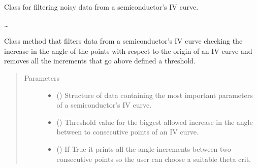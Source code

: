 \documentclass[letterpaper,10pt,english,openany, oneside]{sphinxmanual}
\begin{document}
\begin{fulllineitems}
\label{\detokenize{index:fompy.conditioning.filter_tool}}
Class for filtering noisy data from a semiconductor’s IV curve.

…

\begin{fulllineitems}
\label{\detokenize{index:fompy.conditioning.filter_tool.polar_filter}}
Class method that filters data from a semiconductor’s IV curve checking the increase in the angle
of the points with respect to the origin of an IV curve and removes all the increments that go above
defined a threshold.

\end{fulllineitems}

\begin{quote}\begin{description}
\item[{Parameters}] \leavevmode\begin{itemize}
\item {} 
 () \textendash{} Structure of data containing the most important parameters of a semiconductor’s IV curve.

\item {} 
 () \textendash{} Threshold value for the biggest allowed increase in the angle between to consecutive points
of an IV curve.

\item {} 
 () \textendash{} If True it prints all the angle increments between two consecutive points so the user can
choose a suitable theta crit.

\end{itemize}

\end{description}\end{quote}

\end{fulllineitems}
\end{document}
